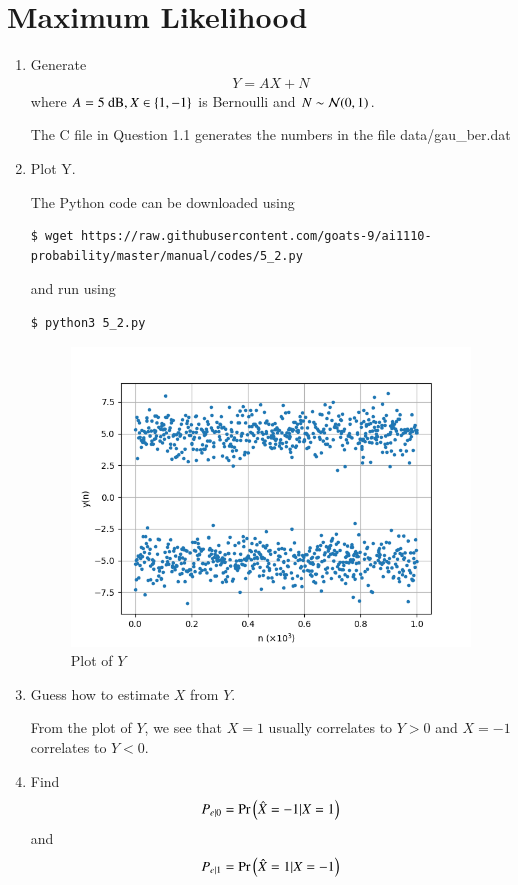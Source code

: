 \documentclass[journal,12pt,twocolumn]{IEEEtran}
\renewcommand\thesection{\arabic{section}}
\begin{document}
\section{Maximum Likelihood}
\begin{enumerate}[label=\thesection.\arabic*
,ref=\thesection.\theenumi]
\item Generate 
	\begin{align}
		Y = AX + N
	\end{align}
where $A  = 5 \text{ dB}, X \in \left\{1, -1\right\}$ is Bernoulli and $N \sim \mathcal{N}(0, 1)$.

\solution
The C file in Question 1.1 generates the numbers in the file data/gau\_ber.dat
\item Plot Y.

\solution
The Python code can be downloaded using
\begin{lstlisting}
$ wget https://raw.githubusercontent.com/goats-9/ai1110-probability/master/manual/codes/5_2.py
\end{lstlisting}
and run using
\begin{lstlisting}
$ python3 5_2.py
\end{lstlisting}
\begin{figure}[!htb]
	\includegraphics[width=\columnwidth]{figs/5_2.png}
	\caption{Plot of $Y$}
	\label{fig:wave}
\end{figure}

\item Guess how to estimate $X$ from $Y$.

\solution
From the plot of $Y$, we see that $X = 1$ usually correlates to $Y > 0$ and $X = -1$ correlates to $Y < 0$.
\item Find 
	\begin{align}
		P_{e|0} = \Pr\left(\hat{X} = -1|X = 1\right)
	\end{align}
and
	\begin{align}
		P_{e|1} = \Pr\left(\hat{X} = 1|X = -1\right)
	\end{align}


\end{enumerate}
\end{document}
